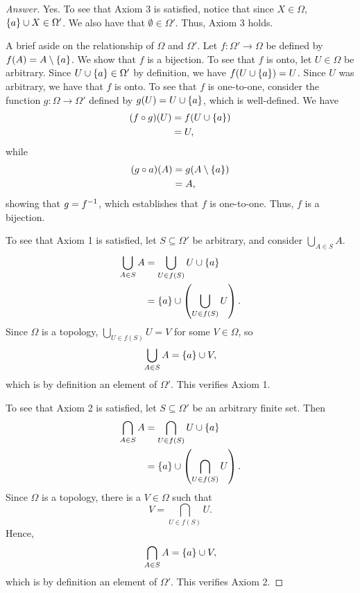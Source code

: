 \begin{proof}[Answer]
    Yes. To see that Axiom 3 is satisfied, notice that since $X \in \Omega$,
    $\{a\} \cup X \in \Omega'$. We also have that $\emptyset \in \Omega'$.
    Thus, Axiom 3 holds.

    A brief aside on the relationship of $\Omega$ and $\Omega'$. Let $f :
    \Omega' \to \Omega$ be defined by $f(A) = A \setminus \{a\}$. We show that
    $f$ is a bijection. To see that $f$ is onto, let $U \in \Omega$ be
    arbitrary. Since $U \cup \{a\} \in \Omega'$ by definition, we have $f(U
    \cup \{a\}) = U$. Since $U$ was arbitrary, we have that $f$ is onto. To
    see that $f$ is one-to-one, consider the function $g : \Omega \to \Omega'$
    defined by $g(U) = U \cup \{a\}$, which is well-defined. We have
    \begin{align*}
        (f \circ g)(U) &= f(U\cup \{a\}) \\
                       &= U,
    \end{align*}
    while
    \begin{align*}
        (g \circ a)(A) &= g(A \setminus \{a\}) \\
                       &= A,
    \end{align*}
    showing that $g = f^{-1}$, which establishes that $f$ is one-to-one. Thus,
    $f$ is a bijection.

    To see that Axiom 1 is satisfied, let $S \subseteq \Omega'$ be arbitrary,
    and consider $\bigcup_{A \in S} A$.     
    \begin{align*}
        \bigcup_{A \in S} A &= \bigcup_{U \in f(S)} U \cup \{a\} \\
                            &= \{a\} \cup \left( \bigcup_{U \in f(S)} U
                            \right). 
    \end{align*}
    Since $\Omega$ is a topology, $\bigcup_{U \in f(S)} U = V$ for some $V \in
    \Omega$, so
    \[
        \bigcup_{A \in S} A = \{a\} \cup V,
    \]
    which is by definition an element of $\Omega'$. This verifies Axiom 1.

    To see that Axiom 2 is satisfied, let $S \subseteq \Omega'$ be an arbitrary
    finite set. Then
    \begin{align*}
        \bigcap_{A \in S} A &= \bigcap_{U \in f(S)} U \cup \{a\} \\
        &= \{a\} \cup \left( \bigcap_{U \in f(S)} U \right).
    \end{align*}
    Since $\Omega$ is a topology, there is a $V \in \Omega$ such that
    \[
        V = \bigcap_{U \in f(S)} U.
    \]
    Hence,
    \[
        \bigcap_{A \in S} A = \{a\} \cup V,
    \]
    which is by definition an element of $\Omega'$. This verifies Axiom 2.
  \end{proof}

